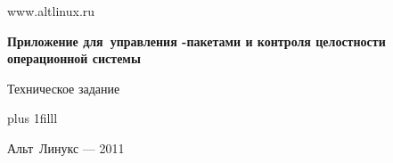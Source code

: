 
\Large
\thispagestyle{empty}
\begin{center}

www.altlinux.ru

\vspace{4cm}

{\LARGE \bf Приложение для~управления -пакетами и контроля целостности\\
операционной системы}

\vspace{1.0cm}

Техническое задание

\end{center}

\vskip 0pt plus 1filll

\begin{center}
Альт~Линукс --- 2011
\end{center}
